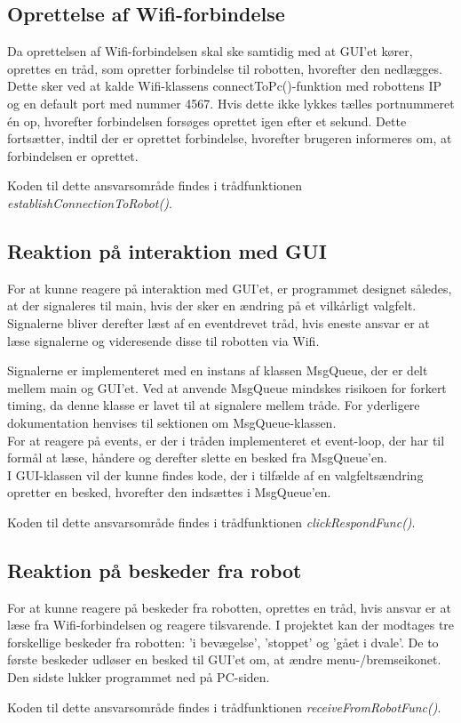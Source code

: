 \subsection{Oprettelse af Wifi-forbindelse}
Da oprettelsen af Wifi-forbindelsen skal ske samtidig med at GUI'et kører, oprettes en tråd, som opretter forbindelse til robotten, hvorefter den nedlægges. 
Dette sker ved at kalde Wifi-klassens connectToPc()-funktion med robottens IP og en default port med nummer 4567. 
Hvis dette ikke lykkes tælles portnummeret én op, hvorefter forbindelsen forsøges oprettet igen efter et sekund.
Dette fortsætter, indtil der er oprettet forbindelse, hvorefter brugeren informeres om, at forbindelsen er oprettet.

Koden til dette ansvarsområde findes i trådfunktionen \textit{establishConnectionToRobot()}.


\subsection{Reaktion på interaktion med GUI}
For at kunne reagere på interaktion med GUI'et, er programmet designet således, at der signaleres til main, hvis der sker en ændring på et vilkårligt valgfelt. 
Signalerne bliver derefter læst af en eventdrevet tråd, hvis eneste ansvar er at læse signalerne og videresende disse til robotten via Wifi. 

Signalerne er implementeret med en instans af klassen MsgQueue, der er delt mellem main og GUI'et.
Ved at anvende MsgQueue mindskes risikoen for forkert timing, da denne klasse er lavet til at signalere mellem tråde.
For yderligere dokumentation henvises til sektionen om MsgQueue-klassen. \\
For at reagere på events, er der i tråden implementeret et event-loop, der har til formål at læse, håndere og derefter slette en besked fra MsgQueue'en.\\
I GUI-klassen vil der kunne findes kode, der i tilfælde af en valgfeltsændring opretter en besked, hvorefter den indsættes i MsgQueue'en.

Koden til dette ansvarsområde findes i trådfunktionen \textit{clickRespondFunc()}.

\subsection{Reaktion på beskeder fra robot}
For at kunne reagere på beskeder fra robotten, oprettes en tråd, hvis ansvar er at læse fra Wifi-forbindelsen og reagere tilsvarende.
I projektet kan der modtages tre forskellige beskeder fra robotten: 'i bevægelse', 'stoppet' og 'gået i dvale'.
De to første beskeder udløser en besked til GUI'et om, at ændre menu-/bremseikonet.
Den sidste lukker programmet ned på PC-siden.

Koden til dette ansvarsområde findes i trådfunktionen \textit{receiveFromRobotFunc()}.